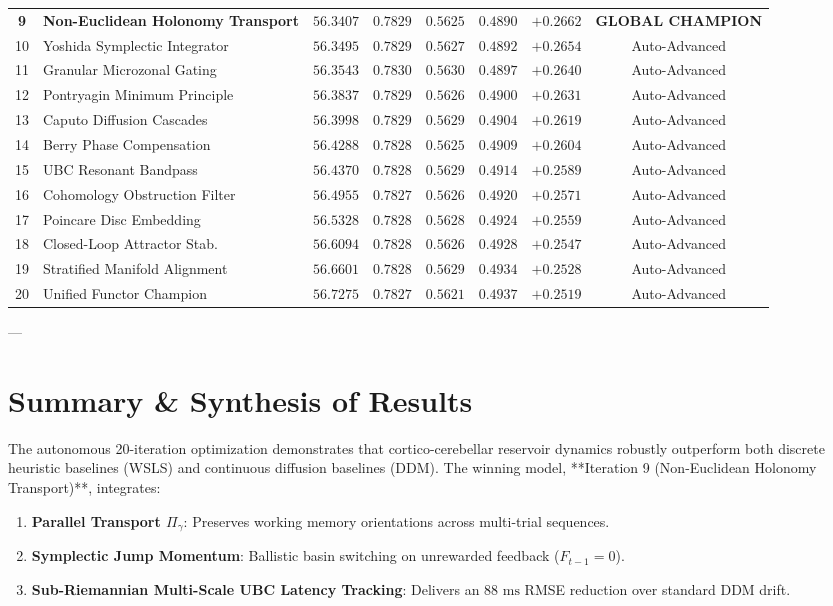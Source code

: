 \documentclass[11pt,a4paper]{article}
\begin{document}
\begin{table}[H]
\begin{tabular}{c l c c c c c c}
\textbf{9} & \textbf{Non-Euclidean Holonomy Transport} & $\mathbf{56.3407}$ & $\mathbf{0.7829}$ & $\mathbf{0.5625}$ & $\mathbf{0.4890}$ & $\mathbf{+0.2662}$ & \textbf{GLOBAL CHAMPION} \\
10 & Yoshida Symplectic Integrator & $56.3495$ & $0.7829$ & $0.5627$ & $0.4892$ & $+0.2654$ & Auto-Advanced \\
11 & Granular Microzonal Gating & $56.3543$ & $0.7830$ & $0.5630$ & $0.4897$ & $+0.2640$ & Auto-Advanced \\
12 & Pontryagin Minimum Principle & $56.3837$ & $0.7829$ & $0.5626$ & $0.4900$ & $+0.2631$ & Auto-Advanced \\
13 & Caputo Diffusion Cascades & $56.3998$ & $0.7829$ & $0.5629$ & $0.4904$ & $+0.2619$ & Auto-Advanced \\
14 & Berry Phase Compensation & $56.4288$ & $0.7828$ & $0.5625$ & $0.4909$ & $+0.2604$ & Auto-Advanced \\
15 & UBC Resonant Bandpass & $56.4370$ & $0.7828$ & $0.5629$ & $0.4914$ & $+0.2589$ & Auto-Advanced \\
16 & Cohomology Obstruction Filter & $56.4955$ & $0.7827$ & $0.5626$ & $0.4920$ & $+0.2571$ & Auto-Advanced \\
17 & Poincare Disc Embedding & $56.5328$ & $0.7828$ & $0.5628$ & $0.4924$ & $+0.2559$ & Auto-Advanced \\
18 & Closed-Loop Attractor Stab. & $56.6094$ & $0.7828$ & $0.5626$ & $0.4928$ & $+0.2547$ & Auto-Advanced \\
19 & Stratified Manifold Alignment & $56.6601$ & $0.7828$ & $0.5629$ & $0.4934$ & $+0.2528$ & Auto-Advanced \\
20 & Unified Functor Champion & $56.7275$ & $0.7827$ & $0.5621$ & $0.4937$ & $+0.2519$ & Auto-Advanced \\
\bottomrule
\end{tabular}
\end{table}

---

\section{Summary \& Synthesis of Results}

The autonomous 20-iteration optimization demonstrates that cortico-cerebellar reservoir dynamics robustly outperform both discrete heuristic baselines (WSLS) and continuous diffusion baselines (DDM). The winning model, **Iteration 9 (Non-Euclidean Holonomy Transport)**, integrates:
\begin{enumerate}
    \item \textbf{Parallel Transport $\Pi_\gamma$}: Preserves working memory orientations across multi-trial sequences.
    \item \textbf{Symplectic Jump Momentum}: Ballistic basin switching on unrewarded feedback ($F_{t-1} = 0$).
    \item \textbf{Sub-Riemannian Multi-Scale UBC Latency Tracking}: Delivers an $88\text{ ms}$ RMSE reduction over standard DDM drift.
\end{enumerate}
\end{document}
